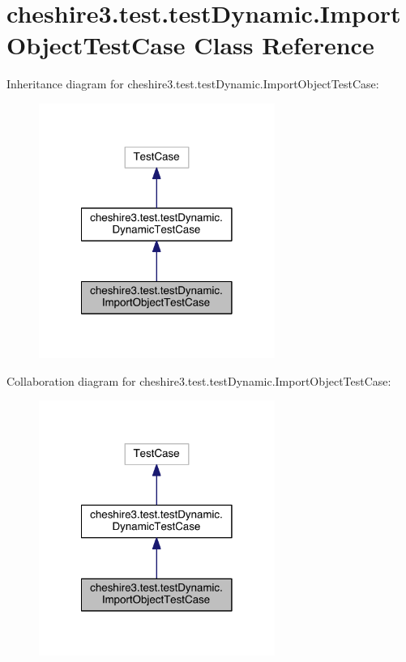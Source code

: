 \hypertarget{classcheshire3_1_1test_1_1test_dynamic_1_1_import_object_test_case}{\section{cheshire3.\-test.\-test\-Dynamic.\-Import\-Object\-Test\-Case Class Reference}
\label{classcheshire3_1_1test_1_1test_dynamic_1_1_import_object_test_case}
}


Inheritance diagram for cheshire3.\-test.\-test\-Dynamic.\-Import\-Object\-Test\-Case\-:
\nopagebreak
\begin{figure}[H]
\begin{center}
\leavevmode
\includegraphics[width=218pt]{classcheshire3_1_1test_1_1test_dynamic_1_1_import_object_test_case__inherit__graph}
\end{center}
\end{figure}


Collaboration diagram for cheshire3.\-test.\-test\-Dynamic.\-Import\-Object\-Test\-Case\-:
\nopagebreak
\begin{figure}[H]
\begin{center}
\leavevmode
\includegraphics[width=218pt]{classcheshire3_1_1test_1_1test_dynamic_1_1_import_object_test_case__coll__graph}
\end{center}
\end{figure}

